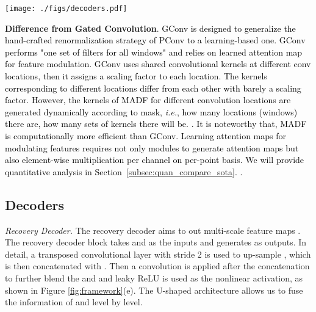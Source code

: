 \documentclass[journal]{IEEEtran}
\begin{document}
\begin{figure*}[!t]
    \centering
    \texttt{[image: ./figs/decoders.pdf]}
    \caption{{\color{black}{The details of recovery decoder and refinement decoders. ``dconv-*'' denotes transposed convolutional layer with * output channels. ``PN'' is the point-wise normalization module and all convolution layers therein are with kernel size of 3 and stride of 1. Note that ``'' means  upsample and is applied to  in refinement decoders and ``cat'' means channel concatenation.}}}
    \label{fig:decoder}
\end{figure*}

\textbf{Difference from Gated Convolution}. 
\textcolor{black}{  
GConv is designed to generalize the hand-crafted renormalization strategy of PConv to a learning-based one. GConv performs "one set of filters for all windows" and relies on learned attention map for feature modulation. GConv uses shared convolutional kernels at different conv locations, then it assigns a scaling factor to each location. The kernels corresponding to different locations differ from each other with barely a scaling factor. However, the kernels of MADF for different convolution locations are generated dynamically according to mask, \textit{i.e.}, how many locations (windows) there are, how many sets of kernels there will be. 
{\color{black}{The design of MADF is more flexible than re-scaling vanilla convolution output of each convolution window and it is orthogonal to the gating mechanism proposed in GConv}.}
It is noteworthy that, MADF is computationally more efficient than GConv.
Learning attention maps for modulating features requires not only modules to generate attention maps but also element-wise multiplication per channel on per-point basis. We will provide quantitative analysis in Section~\ref{subsec:quan_compare_sota}.
{\color{black}{Besides, MADF is compatible with gating mechanism. Combining both of them may further improve the performance if extra computational cost of gating mechanism is not a major concern}.}
}



\subsection{Decoders}
\textit{Recovery Decoder.}
The recovery decoder aims to {\color{black}{roughing}} out multi-scale feature maps .
The  recovery decoder block  takes  and  as the inputs and generates  as outputs. In detail, a transposed convolutional layer with stride 2 is used to up-sample , which is then concatenated with . Then a convolution is applied after the concatenation to further blend the  and  and leaky ReLU is used as the nonlinear activation, as shown in Figure \ref{fig:framework}(e). 
The U-shaped architecture allows us to fuse the information of  and  level by level.
\end{document}
